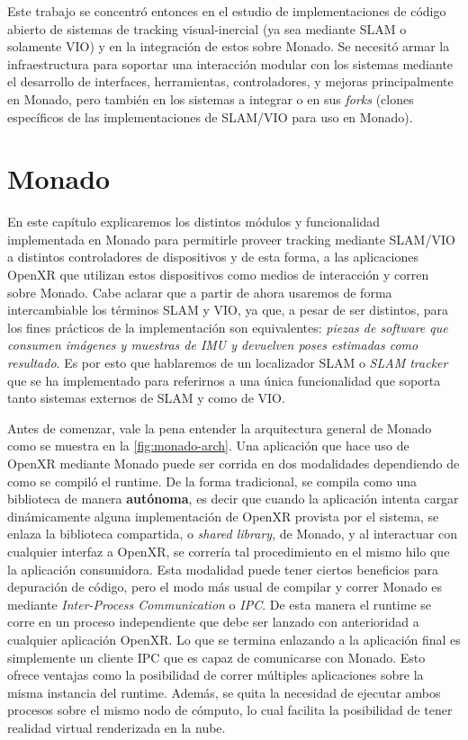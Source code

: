 \documentclass[ twoside,openright,titlepage,numbers=noenddot,%
                headinclude,footinclude,cleardoublepage=empty,abstract=on,
                BCOR=-5mm,paper=a4,fontsize=11pt
                ]{scrreprt}
\newcommand{\figref}{\autoref}
\begin{document}
Este trabajo se concentró entonces en el estudio de implementaciones de
código abierto de sistemas de tracking visual-inercial (ya sea mediante
SLAM o solamente VIO) y en la integración de estos sobre Monado. Se
necesitó armar la infraestructura para soportar una interacción modular
con los sistemas mediante el desarrollo de interfaces, herramientas,
controladores, y mejoras principalmente en Monado, pero también en los
sistemas a integrar o en sus \emph{forks} (clones específicos de las
implementaciones de SLAM/VIO para uso en Monado).

\hypertarget{monado}{%
\section{Monado}\label{monado}}

En este capítulo explicaremos los distintos módulos y funcionalidad
implementada en Monado para permitirle proveer tracking mediante
SLAM/VIO a distintos controladores de dispositivos y de esta forma, a
las aplicaciones OpenXR que utilizan estos dispositivos como medios de
interacción y corren sobre Monado. Cabe aclarar que a partir de ahora
usaremos de forma intercambiable los términos SLAM y VIO, ya que, a
pesar de ser distintos, para los fines prácticos de la implementación
son equivalentes: \emph{piezas de software que consumen imágenes y
muestras de IMU y devuelven poses estimadas como resultado}. Es por esto
que hablaremos de un localizador SLAM o \emph{SLAM tracker} que se ha
implementado para referirnos a una única funcionalidad que soporta tanto
sistemas externos de SLAM y como de VIO.

Antes de comenzar, vale la pena entender la arquitectura general de
Monado como se muestra en la \figref{fig:monado-arch}. Una aplicación
que hace uso de OpenXR mediante Monado puede ser corrida en dos
modalidades dependiendo de como se compiló el runtime. De la forma
tradicional, se compila como una biblioteca de manera \textbf{autónoma},
es decir que cuando la aplicación intenta cargar dinámicamente alguna
implementación de OpenXR provista por el sistema, se enlaza la
biblioteca compartida, o \emph{shared library}, de Monado, y al
interactuar con cualquier interfaz a OpenXR, se correría tal
procedimiento en el mismo hilo que la aplicación consumidora. Esta
modalidad puede tener ciertos beneficios para depuración de código, pero
el modo más usual de compilar y correr Monado es mediante
\emph{Inter-Process Communication} o \emph{IPC}. De esta manera el
runtime se corre en un proceso independiente que debe ser lanzado con
anterioridad a cualquier aplicación OpenXR. Lo que se termina enlazando
a la aplicación final es simplemente un cliente IPC que es capaz de
comunicarse con Monado. Esto ofrece ventajas como la posibilidad de
correr múltiples aplicaciones sobre la misma instancia del runtime.
Además, se quita la necesidad de ejecutar ambos procesos sobre el mismo
nodo de cómputo, lo cual facilita la posibilidad de tener realidad
virtual renderizada en la nube.
\end{document}
